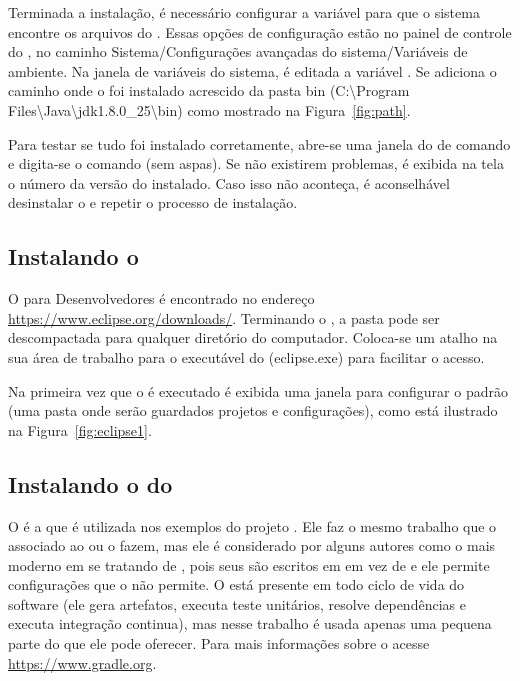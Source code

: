 Terminada a instalação, é necessário configurar a variável  para que o sistema encontre os arquivos do . Essas opções de configuração estão no painel de controle do , no caminho Sistema/Configurações avançadas do sistema/Variáveis de ambiente. Na janela de variáveis do sistema, é editada a variável . Se adiciona o caminho onde o  foi instalado acrescido da pasta bin (C:\textbackslash Program Files\textbackslash Java\textbackslash jdk\textmd{1.8.0\_25}\textbackslash bin) como mostrado na Figura~\ref{fig:path}.


Para testar se tudo foi instalado corretamente, abre-se uma janela do  de comando e digita-se o comando  (sem aspas). Se não existirem problemas, é exibida na tela o número da versão do  instalado. Caso isso não aconteça, é aconselhável desinstalar o  e repetir o processo de instalação. 

\subsection{Instalando o } 

O  para Desenvolvedores  é encontrado no endereço \url{https://www.eclipse.org/downloads/}. Terminando o , a pasta  pode ser descompactada para qualquer diretório do computador. Coloca-se um atalho na sua área de trabalho para o executável do  (eclipse.exe) para facilitar o acesso.

Na primeira vez que o  é executado é exibida uma janela para configurar o  padrão (uma pasta onde serão guardados projetos e configurações), como está ilustrado na Figura~\ref{fig:eclipse1}.


\subsection{Instalando o  do } 

O  é a  que é utilizada nos exemplos do projeto \spring. Ele faz o mesmo trabalho que o  associado ao  ou o  fazem, mas ele é considerado por alguns autores como o mais moderno em se tratando de , pois seus  são escritos em  em vez de  e ele permite configurações que o  não permite. O  está presente em todo ciclo de vida do software (ele gera artefatos, executa teste unitários, resolve dependências e executa integração continua), mas nesse trabalho é usada apenas uma pequena parte do que ele pode oferecer. Para mais informações sobre o  acesse \url{https://www.gradle.org}. 

